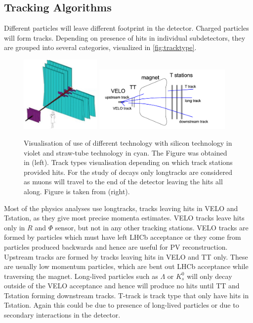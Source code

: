 \subsection{Tracking Algorithms }
Different particles will leave different footprint in the detector. Charged particles will form tracks. Depending on presence of hits in individual subdetectors, they are grouped into several categories, visualized in \autoref{fig:tracktype}.

\begin{figure}[!h]
	\centering
	\includegraphics[width = 0.35\textwidth]{figs/detector/trackingsystem.jpg}%
	\includegraphics[width = 0.6\textwidth]{figs/detector/tracktype.png}
	\caption{ Visualisation of use of different technology with silicon technology in violet and straw-tube technology in cyan. The Figure was obtained in \cite{OT}(left). Track types visualisation depending on which track stations provided hits. For the study of \Bmumumu decays only \gls{longtrack}s are considered as muons will travel to the end of the detector leaving the hits all along. Figure is taken from \cite{LHCb-DP-2013-002} (right).}
	\label{fig:tracktype}
\end{figure}


Most of the physics analyses use \gls{longtrack}s, tracks leaving hits in \Gls{VELO} and \Gls{Tstation}, as they give most precise momenta estimates.
VELO tracks leave hits only in $R$ and $\Phi$ sensor, but not in any other tracking stations. VELO tracks are formed by particles which must have left \Gls{LHCb} acceptance or they come from particles produced backwards and hence are useful for \gls{PV} reconstruction. Upstream tracks are formed by tracks leaving hits in \Gls{VELO} and \gls{TT} only. These are usually low momentum particles, which are bent out \Gls{LHCb} acceptance while traversing the magnet. Long-lived particles such as $\Lambda$ or $K^{0}_{s}$ will only decay outside of the \Gls{VELO} acceptance and hence will produce no hits until \Gls{TT} and \Gls{Tstation} forming downstream tracks. T-track is track type that only have hits in \Gls{Tstation}. Again this could be due to presence of long-lived particles or due to secondary interactions in the detector.   

